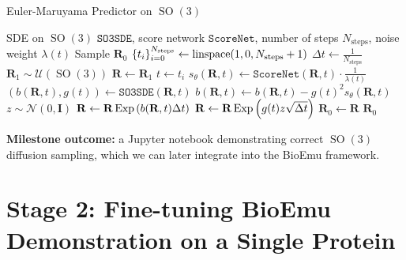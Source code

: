 \documentclass{article}
\theoremstyle{plain}
\theoremstyle{definition}
\theoremstyle{remark}
\DeclareMathOperator{\SO}{SO}
\DeclareMathOperator{\Exp}{\operatorname{Exp}}
\begin{document}
\begin{algorithm}[!ht]
    \caption{Euler-Maruyama Predictor on $\SO(3)$}\label{alg:em_predictor_so3}
    \begin{algorithmic}[1]
        \REQUIRE SDE on $\SO(3)$ $\texttt{SO3SDE}$, score network $\texttt{ScoreNet}$, number of steps $N_\text{steps}$, noise weight $\lambda(t)$
        \ENSURE Sample $\mathbf{R}_0$
        \STATE $\qty{t_i}_{i=0}^{N_\text{steps}} \leftarrow \mathrm{linspace}(1, 0, N_\text{steps}+1)$
        \STATE $\Delta t \leftarrow \frac{1}{N_\text{steps}}$
        \STATE $\mathbf{R}_1 \sim \mathcal{U}(\SO(3))$
        \STATE $\mathbf{R} \leftarrow \mathbf{R}_1$
        \STATE $t \leftarrow t_i$
        \STATE $s_\theta(\mathbf{R}, t) \leftarrow \texttt{ScoreNet}(\mathbf{R}, t)\cdot \frac{1}{\lambda(t)}$
        \STATE $(b(\mathbf{R}, t),g(t)) \leftarrow \texttt{SO3SDE}(\mathbf{R}, t)$
        \STATE $b(\mathbf{R}, t) \leftarrow b(\mathbf{R}, t) - g(t)^2 s_\theta(\mathbf{R}, t)$
        \STATE $z \sim \mathcal{N}(0, \mathbf{I})$
        \STATE $\mathbf{R} \leftarrow \mathbf{R} \Exp\qty(b(\mathbf{R}, t)\Delta t)$
        \STATE $\mathbf{R} \leftarrow \mathbf{R} \Exp\qty(g(t)z\sqrt{\Delta t})$
        \ENDFOR
        \STATE $\mathbf{R}_0 \leftarrow \mathbf{R}$
        \RETURN $\mathbf{R}_0$
    \end{algorithmic}
\end{algorithm}

{\bf Milestone outcome:} a Jupyter notebook demonstrating correct $\SO(3)$ diffusion sampling, which we can later integrate into the BioEmu framework.

\section{Stage 2: Fine-tuning BioEmu Demonstration on a Single Protein}
\end{document}

